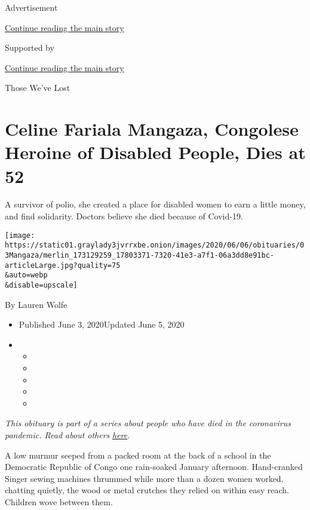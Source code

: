 Advertisement

\protect\hyperlink{after-top}{Continue reading the main story}

Supported by

\protect\hyperlink{after-sponsor}{Continue reading the main story}

Those We've Lost

\hypertarget{celine-fariala-mangaza-congolese-heroine-of-disabled-people-dies-at-52}{%
\section{Celine Fariala Mangaza, Congolese Heroine of Disabled People,
Dies at
52}\label{celine-fariala-mangaza-congolese-heroine-of-disabled-people-dies-at-52}}

A survivor of polio, she created a place for disabled women to earn a
little money, and find solidarity. Doctors believe she died because of
Covid-19.

\texttt{[image: https://static01.graylady3jvrrxbe.onion/images/2020/06/06/obituaries/03Mangaza/merlin\_173129259\_17803371-7320-41e3-a7f1-06a3dd8e91bc-articleLarge.jpg?quality=75\\\&auto=webp\\\&disable=upscale]}

By Lauren Wolfe

\begin{itemize}
\item
  Published June 3, 2020Updated June 5, 2020
\item
  \begin{itemize}
  \item
  \item
  \item
  \item
  \item
  \end{itemize}
\end{itemize}

\emph{This obituary is part of a series about people who have died in
the coronavirus pandemic. Read about others}
\href{https://www.nytimes3xbfgragh.onion/interactive/2020/obituaries/people-died-coronavirus-obituaries.html}{\emph{here}}\emph{.}

A low murmur seeped from a packed room at the back of a school in the
Democratic Republic of Congo one rain-soaked January afternoon.
Hand-cranked Singer sewing machines thrummed while more than a dozen
women worked, chatting quietly, the wood or metal crutches they relied
on within easy reach. Children wove between them.

